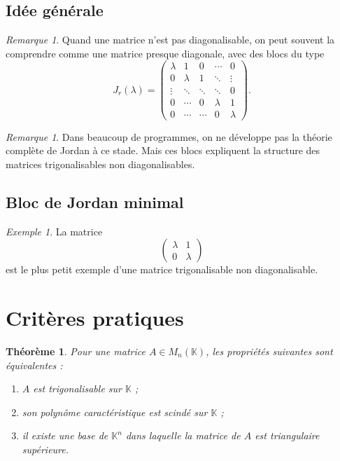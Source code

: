 \documentclass[11pt,a4paper]{article}
\newtheorem{theoreme}[definition]{Théorème}
\theoremstyle{remark}
\newtheorem{remarque}[definition]{Remarque}
\newtheorem{exemple}[definition]{Exemple}
\newcommand{\K}{\mathbb{K}}
\begin{document}
\subsection{Idée générale}

\begin{remarque}
Quand une matrice n’est pas diagonalisable, on peut souvent la comprendre comme une matrice presque diagonale, avec des blocs du type
\[
J_r(\lambda)=
\begin{pmatrix}
\lambda & 1 & 0 & \cdots & 0\\
0 & \lambda & 1 & \ddots & \vdots\\
\vdots & \ddots & \ddots & \ddots & 0\\
0 & \cdots & 0 & \lambda & 1\\
0 & \cdots & \cdots & 0 & \lambda
\end{pmatrix}.
\]
\end{remarque}

\begin{remarque}
Dans beaucoup de programmes, on ne développe pas la théorie complète de Jordan à ce stade. Mais ces blocs expliquent la structure des matrices trigonalisables non diagonalisables.
\end{remarque}

\subsection{Bloc de Jordan minimal}

\begin{exemple}
La matrice
\[
\begin{pmatrix}
\lambda & 1\\
0 & \lambda
\end{pmatrix}
\]
est le plus petit exemple d’une matrice trigonalisable non diagonalisable.
\end{exemple}

\section{Critères pratiques}

\begin{theoreme}
Pour une matrice \(A\in M_n(\K)\), les propriétés suivantes sont équivalentes :
\begin{enumerate}[label=\arabic*)]
    \item \(A\) est trigonalisable sur \(\K\) ;
    \item son polynôme caractéristique est scindé sur \(\K\) ;
    \item il existe une base de \(\K^n\) dans laquelle la matrice de \(A\) est triangulaire supérieure.
\end{enumerate}
\end{theoreme}
\end{document}
